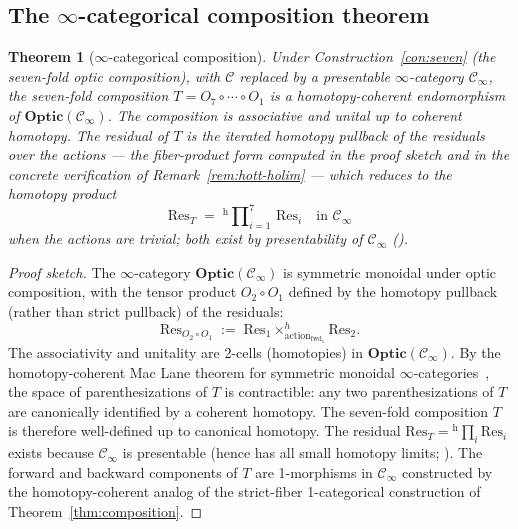 \documentclass[11pt,a4paper]{article}
\theoremstyle{plain}
\newtheorem{theorem}{Theorem}[section]
\theoremstyle{definition}
\theoremstyle{remark}
\newcommand{\Optic}{\mathbf{Optic}}
\begin{document}
\subsection{The $\infty$-categorical composition theorem}

\begin{theorem}[$\infty$-categorical composition]
\label{thm:hott-composition}
Under Construction~\ref{con:seven} (the seven-fold optic composition),
with $\mathcal{C}$ replaced by a presentable $\infty$-category
$\mathcal{C}_\infty$, the seven-fold composition $T = O_7 \circ \cdots
\circ O_1$ is a homotopy-coherent endomorphism of
$\Optic(\mathcal{C}_\infty)$. The composition is associative and
unital up to coherent homotopy. The residual of $T$ is the iterated homotopy pullback of the
residuals over the actions --- the fiber-product form computed in
the proof sketch and in the concrete verification of
Remark~\ref{rem:hott-holim} --- which reduces to the homotopy
product
\[
\mathrm{Res}_T \;=\; {}^{\mathrm{h}}\!\prod\nolimits_{i=1}^{7}\,\mathrm{Res}_i
\quad \text{in } \mathcal{C}_\infty
\]
when the actions are trivial; both exist by presentability of
$\mathcal{C}_\infty$
(\cite[Proposition~5.5.3.1]{lurie2009htt}).
\end{theorem}

\begin{proof}[Proof sketch]
The $\infty$-category $\Optic(\mathcal{C}_\infty)$ is symmetric
monoidal under optic composition, with the tensor product $O_2 \circ
O_1$ defined by the homotopy pullback (rather than strict pullback) of
the residuals:
\[
\mathrm{Res}_{O_2 \circ O_1} \;:=\;
\mathrm{Res}_1 \times^h_{\mathrm{action}_{\mathrm{fwd}_1}} \mathrm{Res}_2.
\]
The associativity and unitality are 2-cells (homotopies) in
$\Optic(\mathcal{C}_\infty)$. By the homotopy-coherent Mac Lane theorem
for symmetric monoidal $\infty$-categories~\cite[Theorem~2.4.3]
{lurie2017ha}, the space of parenthesizations of $T$ is contractible:
any two parenthesizations of $T$ are canonically identified by a
coherent homotopy. The seven-fold composition $T$ is therefore
well-defined up to canonical homotopy. The residual
$\mathrm{Res}_T = {}^{\mathrm{h}}\!\prod_i \mathrm{Res}_i$ exists because
$\mathcal{C}_\infty$ is presentable (hence has all small homotopy
limits; \cite[Proposition~5.5.3.1]{lurie2009htt}). The forward and
backward components of $T$ are 1-morphisms in $\mathcal{C}_\infty$
constructed by the homotopy-coherent analog of the strict-fiber
1-categorical construction of Theorem~\ref{thm:composition}.
\end{proof}
\end{document}

